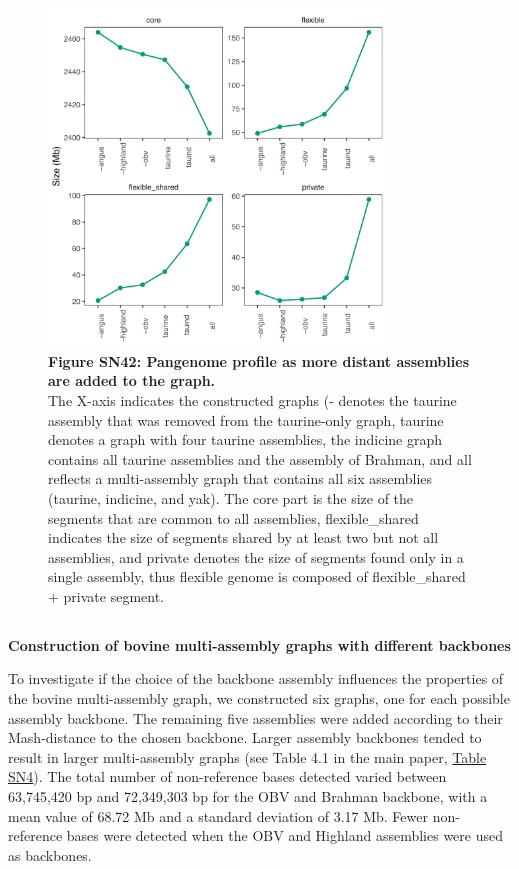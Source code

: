 \documentclass[../main.tex]{subfiles}
\begin{document}
\begin{flushleft}
\bigskip
\begin{figure}[!htb]
    \centering
    \includegraphics[width=0.8\textwidth]{paper3/supplement/sp416.pdf}
    \caption*{\textbf{\hypertarget{Figure SN42}{Figure SN42}: Pangenome profile as more distant assemblies are added to the graph.} \\
    \footnotesize{The X-axis indicates the constructed graphs (- denotes the taurine assembly that was removed from the taurine-only graph, taurine denotes a graph with four taurine assemblies, the indicine graph contains all taurine assemblies and the assembly of Brahman, and all reflects a multi-assembly graph that contains all six assemblies (taurine, indicine, and yak). The core part is the size of the segments that are common to all assemblies, flexible\_shared indicates the size of segments shared by at least two but not all assemblies, and private denotes the size of segments found only in a single assembly, thus flexible genome is composed of flexible\_shared + private segment.}}
\end{figure}

\newpage

\subsection{}
\label{sup_not:s43}
\textbf{Construction of bovine multi-assembly graphs with different backbones}
\bigskip

To investigate if the choice of the backbone assembly influences the properties of the bovine multi-assembly graph, we constructed six graphs, one for each possible assembly backbone. The remaining five assemblies were added according to their Mash-distance to the chosen backbone. Larger assembly backbones tended to result in larger multi-assembly graphs (see Table 4.1 in the main paper, \hyperlink{Table SN4}{Table SN4}). The total number of non-reference bases detected varied between 63,745,420 bp and 72,349,303 bp for the OBV and Brahman backbone, with a mean value of 68.72 Mb and a standard deviation of 3.17 Mb. Fewer non-reference bases were detected when the OBV and Highland assemblies were used as backbones.
\bigskip


\end{flushleft}
\end{document}
